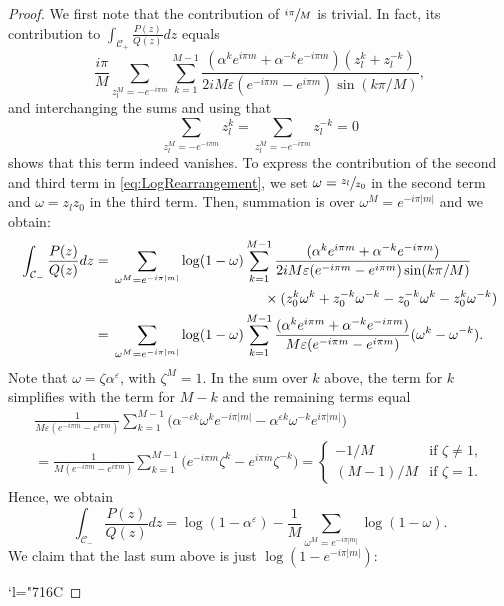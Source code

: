 \documentclass[JEP,XML,SOM,Unicode,NoFloatCountersInSection,published]{cedram}
\newcommand{\Changelback}{\mathcode`l="716C}
\theoremstyle{plain}
\theoremstyle{definition}
\theoremstyle{remark}
\numberwithin{equation}{section}
\begin{document}
\begin{proof}
We first note that the contribution of $\sfrac{i\pi}{M}$ is trivial. In fact, its contribution to $\int_{\mathcal C_+} \frac{P(z)}{Q(z)}dz$ equals
\[
\frac{i\pi}{M}\sum_{z_l^M=-e^{-i\pi m}}\sum_{k=1}^{M-1}\frac {(\alpha^k e^{i\pi m} + \alpha^{-k}e^{-i\pi m})(z_l^k+z_l^{-k})}{2iM\varepsilon(e^{-i\pi m}-e^{i\pi m}) \sin(k\pi/M)},
\]
and interchanging the sums and using that
\[
\sum_{z_l^M=-e^{-i\pi m}}z_l^k = \sum_{z_l^M=-e^{-i\pi m}}z_l^{-k} = 0
\]
shows that this term indeed vanishes. To express the contribution of the second and third term in \cref{eq:LogRearrangement}, we set $\omega = \sfrac {z_l}{z_0}$ in the second term and $\omega = z_l z_0$ in the third term. Then, summation is over $\omega^M=e^{-i\pi|m|}$ and we obtain:
\begin{align*}
\int_{\mathcal C_-} \frac{P(z)}{Q(z)} dz ={}& \sum_{\omega^M=e^{-i\pi |m|}} \log(1-\omega) \sum_{k=1}^{M-1} \frac {(\alpha^k e^{i\pi m} + \alpha^{-k}e^{-i\pi m})}{2iM\varepsilon(e^{-i\pi m} - e^{i\pi m}) \sin(k\pi/M)}\\
&\hspace{3.8cm}\times(z_0^k\omega^k + z_0^{-k} \omega^{-k} - z_0^{-k} \omega^k - z_0^k \omega^{-k})\\
={}& \sum_{\omega^M=e^{-i\pi |m|}} \log(1-\omega) \sum_{k=1}^{M-1} \frac {(\alpha^k e^{i\pi m} + \alpha^{-k}e^{-i\pi m})}{M\varepsilon(e^{-i\pi m} - e^{i\pi m})}(\omega^k-\omega^{-k}).
\end{align*}
Note that $\omega=\zeta \alpha^\varepsilon$, with $\zeta^M=1$. In the sum over $k$ above, the term for $k$ simplifies with the term for $M-k$ and the remaining terms equal
\begin{multline*}
\frac 1 {M\varepsilon(e^{-i\pi m} - e^{i\pi m})} \sum_{k=1}^{M-1}\big(\alpha^{-\varepsilon k}\omega^ke^{-i\pi|m|}-\alpha^{\varepsilon k}\omega^{-k}e^{i\pi|m|}\big)\\
= \frac 1 {M(e^{-i\pi m} - e^{i\pi m})} \sum_{k=1}^{M-1} \big(e^{-i\pi m}\zeta^k - e^{i\pi m} \zeta^{-k}\big) = \begin{cases} -1/M & \text{if } \zeta \neq 1,\\ (M-1)/M & \text{if } \zeta = 1.\end{cases}
\end{multline*}
Hence, we obtain
\[
\int_{\mathcal C_-} \frac{P(z)}{Q(z)}dz = \log(1-\alpha^\varepsilon) - \frac 1 M \sum_{\omega^M = e^{-i\pi |m|}} \log (1-\omega).
\]
We claim that the last sum above is just $\log (1-e^{-i\pi |m|})$:

\Changelback


\end{proof}
\end{document}
